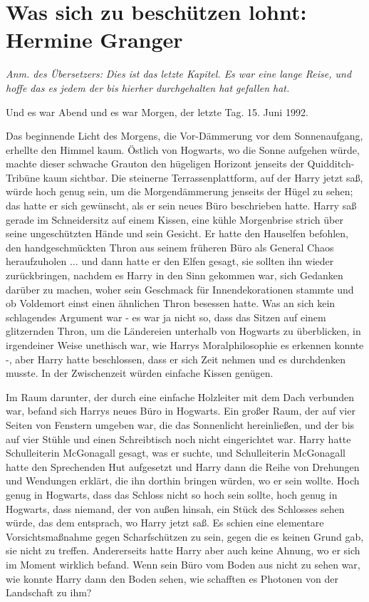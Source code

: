 \chapter{Was sich zu beschützen lohnt: Hermine Granger}

\emph{Anm. des Übersetzers:}
\emph{Dies ist das letzte Kapitel. Es war eine lange Reise, und hoffe das es jedem der bis hierher durchgehalten hat gefallen hat.}

Und es war Abend und es war Morgen, der letzte Tag. 15. Juni 1992.

Das beginnende Licht des Morgens, die Vor-Dämmerung vor dem Sonnenaufgang,
erhellte den Himmel kaum. Östlich von Hogwarts, wo die Sonne aufgehen würde,
machte dieser schwache Grauton den hügeligen Horizont jenseits der
Quidditch-Tribüne kaum sichtbar. Die steinerne Terrassenplattform, auf der Harry
jetzt saß, würde hoch genug sein, um die Morgendämmerung jenseits der Hügel zu
sehen; das hatte er sich gewünscht, als er sein neues Büro beschrieben hatte.
Harry saß gerade im Schneidersitz auf einem Kissen, eine kühle Morgenbrise
strich über seine ungeschützten Hände und sein Gesicht. Er hatte den Hauselfen
befohlen, den handgeschmückten Thron aus seinem früheren Büro als General Chaos
heraufzuholen ... und dann hatte er den Elfen gesagt, sie sollten ihn wieder
zurückbringen, nachdem es Harry in den Sinn gekommen war, sich Gedanken darüber
zu machen, woher sein Geschmack für Innendekorationen stammte und ob Voldemort
einst einen ähnlichen Thron besessen hatte. Was an sich kein schlagendes
Argument war - es war ja nicht so, dass das Sitzen auf einem glitzernden Thron,
um die Ländereien unterhalb von Hogwarts zu überblicken, in irgendeiner Weise
unethisch war, wie Harrys Moralphilosophie es erkennen konnte -, aber Harry
hatte beschlossen, dass er sich Zeit nehmen und es durchdenken musste. In der
Zwischenzeit würden einfache Kissen genügen.

Im Raum darunter, der durch eine einfache Holzleiter mit dem Dach verbunden war,
befand sich Harrys neues Büro in Hogwarts. Ein großer Raum, der auf vier Seiten
von Fenstern umgeben war, die das Sonnenlicht hereinließen, und der bis auf vier
Stühle und einen Schreibtisch noch nicht eingerichtet war. Harry hatte
Schulleiterin McGonagall gesagt, was er suchte, und Schulleiterin McGonagall
hatte den Sprechenden Hut aufgesetzt und Harry dann die Reihe von Drehungen und
Wendungen erklärt, die ihn dorthin bringen würden, wo er sein wollte. Hoch genug
in Hogwarts, dass das Schloss nicht so hoch sein sollte, hoch genug in Hogwarts,
dass niemand, der von außen hinsah, ein Stück des Schlosses sehen würde, das dem
entsprach, wo Harry jetzt saß. Es schien eine elementare Vorsichtsmaßnahme gegen
Scharfschützen zu sein, gegen die es keinen Grund gab, sie nicht zu treffen.
Andererseits hatte Harry aber auch keine Ahnung, wo er sich im Moment wirklich
befand. Wenn sein Büro vom Boden aus nicht zu sehen war, wie konnte Harry dann
den Boden sehen, wie schafften es Photonen von der Landschaft zu ihm?

